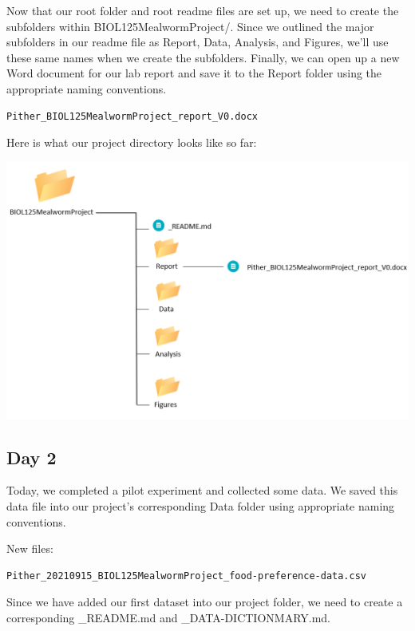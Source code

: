 \documentclass[
]{book}
\begin{document}
Now that our root folder and root readme files are set up, we need to create the subfolders within BIOL125MealwormProject/. Since we outlined the major subfolders in our readme file as Report, Data, Analysis, and Figures, we'll use these same names when we create the subfolders. Finally, we can open up a new Word document for our lab report and save it to the Report folder using the appropriate naming conventions.

\begin{verbatim}
Pither_BIOL125MealwormProject_report_V0.docx
\end{verbatim}

Here is what our project directory looks like so far:

\includegraphics{images/DS_directory-example-1.png}

\hypertarget{day-2-1}{%
\subsection*{Day 2}\label{day-2-1}}

Today, we completed a pilot experiment and collected some data. We saved this data file into our project's corresponding Data folder using appropriate naming conventions.

New files:

\begin{verbatim}
Pither_20210915_BIOL125MealwormProject_food-preference-data.csv
\end{verbatim}

Since we have added our first dataset into our project folder, we need to create a corresponding \_README.md and \_DATA-DICTIONMARY.md.
\end{document}
